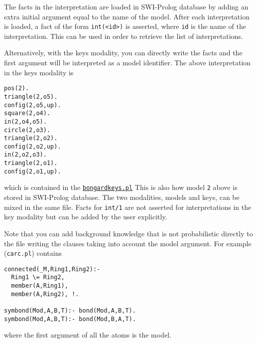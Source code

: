 The facts in the interpretation are loaded in SWI-Prolog database by adding an extra initial argument equal to the name of the model.
After each interpretation is loaded, a fact of the form \verb|int(<id>)| is asserted, where \verb|id| is the name of the interpretation. This can be used in
order to retrieve the list of interpretations.

Alternatively, with the keys modality, you can directly write the facts and the first argument will be interpreted as a model identifier. The above interpretation in the keys modality is
\begin{verbatim}
pos(2).
triangle(2,o5).
config(2,o5,up).
square(2,o4).
in(2,o4,o5).
circle(2,o3).
triangle(2,o2).
config(2,o2,up).
in(2,o2,o3).
triangle(2,o1).
config(2,o1,up).
\end{verbatim}
which is contained in the \href{http://cplint.lamping.unife.it/example/learning/bongardkeys.pl}{\texttt{bongardkeys.pl}}
This is also how model \verb|2| above is stored in SWI-Prolog database.
The two modalities, models and keys, can be mixed in the same file.
Facts for \verb|int/1| are not asserted for interpretations in the key
modality but can be added by the user explicitly.


Note that you can add background knowledge that is not probabilistic directly to the file writing the clauses taking into account the model argument. For example (\texttt{carc.pl})
contains
\begin{verbatim}
connected(_M,Ring1,Ring2):-
  Ring1 \= Ring2,
  member(A,Ring1),
  member(A,Ring2), !.

symbond(Mod,A,B,T):- bond(Mod,A,B,T).
symbond(Mod,A,B,T):- bond(Mod,B,A,T).
\end{verbatim}
where the first argument of all the atoms is the model.

